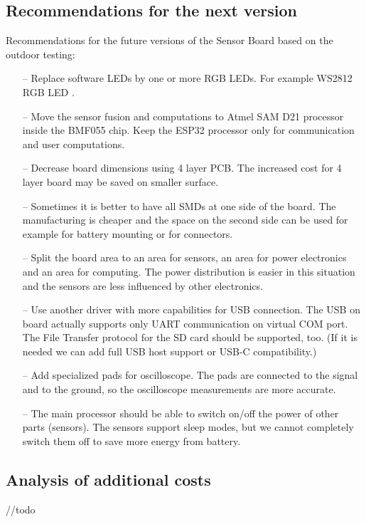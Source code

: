 \subsection{Recommendations for the next version}
\label{recommendationsNextVerison}
Recommendations for the future versions of the Sensor Board based on the outdoor testing:
\begin{itemize}
	\item[--] Replace software LEDs by one or more RGB LEDs. For example WS2812 RGB LED \cite{AdafruitLED}.
	\item[--] Move the sensor fusion and computations to Atmel SAM D21 \cite{AtmelSAM} processor inside the BMF055 \cite{BMF055} chip. Keep the ESP32 \cite{ESP32} processor only for communication and user computations.
	\item[--] Decrease board dimensions using 4 layer PCB. The increased cost for 4 layer board may be saved on smaller surface.
	\item[--] Sometimes it is better to have all SMDs at one side of the board. The manufacturing is cheaper and the space on the second side can be used for example for battery mounting or for connectors.
	\item[--] Split the board area to an area for sensors, an area for power electronics and an area for computing. The power distribution is easier in this situation and the sensors are less influenced by other electronics.
	\item[--] Use another driver with more capabilities for USB connection. The USB on board actually supports only UART communication on virtual COM port. The File Transfer protocol for the SD card should be supported, too. (If it is needed we can add full USB host support or USB-C compatibility.)
	\item[--] Add specialized pads for oscilloscope. The pads are connected to the signal and to the ground, so the oscilloscope measurements are more accurate.
	\item[--] The main processor should be able to switch on/off the power of other parts (sensors). The sensors support sleep modes, but we cannot completely switch them off to save more energy from battery.
\end{itemize}
	
\subsection{Analysis of additional costs}
\label{HWadditionalCosts}
//todo

